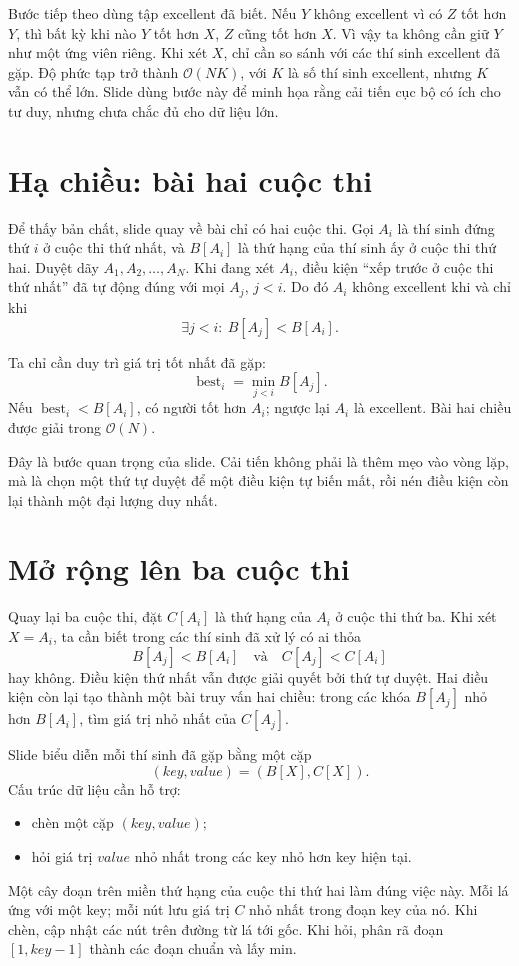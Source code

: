 \documentclass[11pt]{article}
\newcommand{\Oh}{\mathcal{O}}
\begin{document}
Bước tiếp theo dùng tập excellent đã biết. Nếu \(Y\) không excellent vì có
\(Z\) tốt hơn \(Y\), thì bất kỳ khi nào \(Y\) tốt hơn \(X\), \(Z\) cũng tốt
hơn \(X\). Vì vậy ta không cần giữ \(Y\) như một ứng viên riêng. Khi xét
\(X\), chỉ cần so sánh với các thí sinh excellent đã gặp. Độ phức tạp trở
thành \(\Oh(NK)\), với \(K\) là số thí sinh excellent, nhưng \(K\) vẫn có thể
lớn. Slide dùng bước này để minh họa rằng cải tiến cục bộ có ích cho tư duy,
nhưng chưa chắc đủ cho dữ liệu lớn.

\section{Hạ chiều: bài hai cuộc thi}

Để thấy bản chất, slide quay về bài chỉ có hai cuộc thi. Gọi \(A_i\) là thí
sinh đứng thứ \(i\) ở cuộc thi thứ nhất, và \(B[A_i]\) là thứ hạng của thí
sinh ấy ở cuộc thi thứ hai. Duyệt dãy \(A_1,A_2,\ldots,A_N\). Khi đang xét
\(A_i\), điều kiện ``xếp trước ở cuộc thi thứ nhất'' đã tự động đúng với mọi
\(A_j\), \(j<i\). Do đó \(A_i\) không excellent khi và chỉ khi
\[
  \exists j<i:\ B[A_j]<B[A_i].
\]

Ta chỉ cần duy trì giá trị tốt nhất đã gặp:
\[
  \operatorname{best}_i=\min_{j<i}B[A_j].
\]
Nếu \(\operatorname{best}_i<B[A_i]\), có người tốt hơn \(A_i\); ngược lại
\(A_i\) là excellent. Bài hai chiều được giải trong \(\Oh(N)\).

Đây là bước quan trọng của slide. Cải tiến không phải là thêm mẹo vào vòng
lặp, mà là chọn một thứ tự duyệt để một điều kiện tự biến mất, rồi nén điều
kiện còn lại thành một đại lượng duy nhất.

\section{Mở rộng lên ba cuộc thi}

Quay lại ba cuộc thi, đặt \(C[A_i]\) là thứ hạng của \(A_i\) ở cuộc thi thứ
ba. Khi xét \(X=A_i\), ta cần biết trong các thí sinh đã xử lý có ai thỏa
\[
  B[A_j]<B[A_i]\quad\text{và}\quad C[A_j]<C[A_i]
\]
hay không. Điều kiện thứ nhất vẫn được giải quyết bởi thứ tự duyệt. Hai điều
kiện còn lại tạo thành một bài truy vấn hai chiều: trong các khóa
\(B[A_j]\) nhỏ hơn \(B[A_i]\), tìm giá trị nhỏ nhất của \(C[A_j]\).

Slide biểu diễn mỗi thí sinh đã gặp bằng một cặp
\[
  (\mathit{key},\mathit{value})=(B[X],C[X]).
\]
Cấu trúc dữ liệu cần hỗ trợ:
\begin{itemize}
  \item chèn một cặp \((\mathit{key},\mathit{value})\);
  \item hỏi giá trị \(\mathit{value}\) nhỏ nhất trong các key nhỏ hơn key hiện
  tại.
\end{itemize}
Một cây đoạn trên miền thứ hạng của cuộc thi thứ hai làm đúng việc này. Mỗi
lá ứng với một key; mỗi nút lưu giá trị \(C\) nhỏ nhất trong đoạn key của nó.
Khi chèn, cập nhật các nút trên đường từ lá tới gốc. Khi hỏi, phân rã đoạn
\([1,\mathit{key}-1]\) thành các đoạn chuẩn và lấy min.
\end{document}
